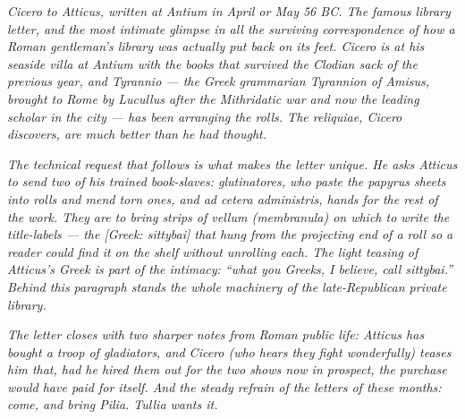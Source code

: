 
\textit{Cicero to Atticus, written at Antium in April or May 56
BC. The famous library letter, and the most intimate glimpse
in all the surviving correspondence of how a Roman gentleman's
library was actually put back on its feet. Cicero is at his
seaside villa at Antium with the books that survived the
Clodian sack of the previous year, and Tyrannio --- the Greek
grammarian Tyrannion of Amisus, brought to Rome by Lucullus
after the Mithridatic war and now the leading scholar in the
city --- has been arranging the rolls. The reliquiae, Cicero
discovers, are much better than he had thought.}

\textit{The technical request that follows is what makes the
letter unique. He asks Atticus to send two of his trained
book-slaves: glutinatores, who paste the papyrus sheets into
rolls and mend torn ones, and ad cetera administris, hands for
the rest of the work. They are to bring strips of vellum
(membranula) on which to write the title-labels --- the
\textit{[Greek: sittybai]} that hung from the projecting end of a
roll so a reader could find it on the shelf without unrolling
each. The light teasing of Atticus's Greek is part of the
intimacy: ``what you Greeks, I believe, call sittybai.'' Behind
this paragraph stands the whole machinery of the late-Republican
private library.}

\textit{The letter closes with two sharper notes from Roman
public life: Atticus has bought a troop of gladiators, and
Cicero (who hears they fight wonderfully) teases him that, had
he hired them out for the two shows now in prospect, the
purchase would have paid for itself. And the steady refrain of
the letters of these months: come, and bring Pilia. Tullia
wants it.}
